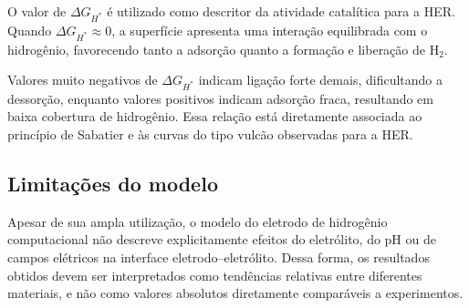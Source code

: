 O valor de \( \Delta G_{H^*} \) é utilizado como descritor da atividade catalítica para a HER. Quando \( \Delta G_{H^*} \approx 0 \), a superfície apresenta uma interação equilibrada com o hidrogênio, favorecendo tanto a adsorção quanto a formação e liberação de \(\mathrm{H_2}\).

Valores muito negativos de \( \Delta G_{H^*} \) indicam ligação forte demais, dificultando a dessorção, enquanto valores positivos indicam adsorção fraca, resultando em baixa cobertura de hidrogênio. Essa relação está diretamente associada ao princípio de Sabatier e às curvas do tipo vulcão observadas para a HER.

\subsection{Limitações do modelo}

Apesar de sua ampla utilização, o modelo do eletrodo de hidrogênio computacional não descreve explicitamente efeitos do eletrólito, do pH ou de campos elétricos na interface eletrodo--eletrólito. Dessa forma, os resultados obtidos devem ser interpretados como tendências relativas entre diferentes materiais, e não como valores absolutos diretamente comparáveis a experimentos.

